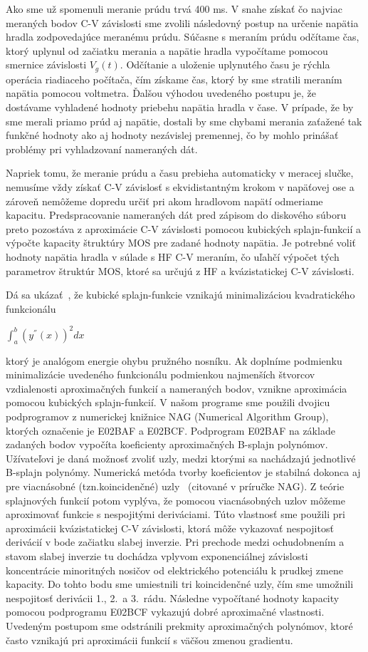 Ako sme už spomenuli meranie prúdu trvá 400 ms.  V snahe získať čo
najviac meraných bodov C-V závislosti sme zvolili následovný postup na
určenie napätia hradla zodpovedajúce meranému prúdu. Súčasne s meraním
prúdu odčítame čas, ktorý uplynul od začiatku merania a napätie hradla
vypočítame pomocou smernice závislosti $V_{g}(t)$. Odčítanie a
uloženie uplynutého času je rýchla operácia riadiaceho počítača, čím
získame čas, ktorý by sme stratili meraním napätia pomocou
voltmetra. Ďalšou výhodou uvedeného postupu je, že dostávame vyhladené
hodnoty priebehu napätia hradla v čase. V prípade, že by sme merali
priamo prúd aj napätie, dostali by sme chybami merania zaťažené tak
funkčné hodnoty ako aj hodnoty nezávislej premennej, čo by mohlo
prinášať problémy pri vyhladzovaní nameraných dát.

Napriek tomu, že meranie prúdu a času prebieha automaticky v meracej
slučke, nemusíme vždy získať C-V závislosť s ekvidistantným krokom v
napäťovej ose a zároveň nemôžeme dopredu určiť pri akom hradlovom
napätí odmeriame kapacitu.  Predspracovanie nameraných dát pred
zápisom do diskového súboru preto pozostáva z aproximácie C-V
závislosti pomocou kubických splajn-funkcií a výpočte kapacity
štruktúry MOS pre zadané hodnoty napätia. Je potrebné voliť hodnoty
napätia hradla v súlade s HF C-V meraním, čo uľahčí výpočet tých
parametrov štruktúr MOS, ktoré sa určujú z HF a kvázistatickej C-V
závislosti.

Dá sa ukázať~\cite{5.4}, že kubické splajn-funkcie vznikajú
minimalizáciou kvadratického funkcionálu

$\int_{a}^{b}{(y^{''}(x))}^{2}dx$

ktorý je analógom energie ohybu pružného nosníku. Ak doplníme
podmienku minimalizácie uvedeného funkcionálu podmienkou najmenších
štvorcov vzdialenosti aproximačných funkcií a nameraných bodov,
vznikne aproximácia pomocou kubických splajn-funkcií. V našom programe
sme použili dvojicu podprogramov z numerickej knižnice NAG (Numerical
Algorithm Group), ktorých označenie je E02BAF a E02BCF\@. Podprogram
E02BAF na základe zadaných bodov vypočíta koeficienty aproximačných
B-splajn polynómov.  Užívateľovi je daná možnosť zvoliť uzly, medzi
ktorými sa nachádzajú jednotlivé B-splajn polynómy. Numerická metóda
tvorby koeficientov je stabilná dokonca aj pre viacnásobné
(tzn.koincidenčné) uzly~\cite{5.5, 5.6} (citované v príručke NAG). Z
teórie splajnových funkcií potom vyplýva, že pomocou viacnásobných
uzlov môžeme aproximovať funkcie s nespojitými deriváciami. Túto
vlastnosť sme použili pri aproximácii kvázistatickej C-V závislosti,
ktorá môže vykazovať nespojitosť derivácií v bode začiatku slabej
inverzie. Pri prechode medzi ochudobnením a stavom slabej inverzie tu
dochádza vplyvom exponenciálnej závislosti koncentrácie minoritných
nosičov od elektrického potenciálu k prudkej zmene kapacity. Do tohto
bodu sme umiestnili tri koincidenčné uzly, čím sme umožnili
nespojitosť derivácii 1., 2.\ a 3.\ rádu. Následne vypočítané hodnoty
kapacity pomocou podprogramu E02BCF vykazujú dobré aproximačné
vlastnosti. Uvedeným postupom sme odstránili prekmity aproximačných
polynómov, ktoré často vznikajú pri aproximácii funkcií s väčšou
zmenou gradientu.

